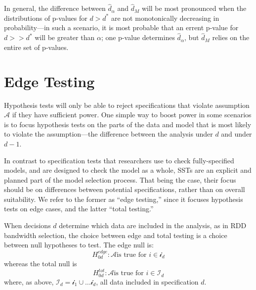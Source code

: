 \documentclass[12pt]{article}\usepackage[]{graphicx}\usepackage[]{color}
\newcommand{\dstar}{d^*}
\newcommand{\dhat}{\hat{d}}
\newcommand{\dhatm}{\hat{d}_M}
\newcommand{\hedged}{H_{0d}^{edge}}
\newcommand{\htotd}{H_{0d}^{tot}}
\begin{document}
In general, the difference between $\dhat_\alpha$ and $\dhatm$ will be
most pronounced when the distributions of p-values for $d>\dstar$ are
not monotonically decreasing in probability---in such a scenario, it
is most probable that an errent p-value for $d>>\dstar$ will be
greater than $\alpha$; one p-value determines $\dhat_\alpha$, but
$\dhatm$ relies on the entire set of p-values.

\section{Edge Testing}
Hypothesis tests will only be able to reject specifications that
violate assumption $\mathcal{A}$ if they have sufficient power.
One simple way to boost power in some scenarios is to focus hypothesis
tests on the parts of the data and model that is most likely to
violate the assumption---the difference between the analysis under $d$
and under $d-1$.

In contrast to specification tests that researchers use to check
fully-specified models, and are designed to check the model as a
whole, SSTs are an explicit and planned part of the model selection
process.
That being the case, their focus should be on differences between
potential specifications, rather than on overall suitability.
We refer to the former as ``edge testing,'' since it focuses
hypothesis tests on edge cases, and the latter ``total testing.''

When decisions $d$ determine which data are included in the analysis,
as in RDD bandwidth selection, the choice between edge and total
testing is a choice between null hypotheses to test.
The edge null is:
\begin{equation}
\hedged: \mathcal{A} \text{is true for } i \in
\mathcal{i}_d
\end{equation}
whereas the total null is
\begin{equation}
\htotd: \mathcal{A} \text{is true for } i \in
\mathcal{I}_d
\end{equation}
where, as above,
$\mathcal{I}_d=\mathcal{i}_1\cup\dots\mathcal{i}_d$, all data
included in specification $d$.
\end{document}
